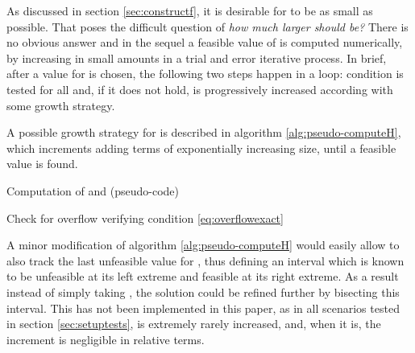 \documentclass[preprint,1p,times]{elsarticle}
\begin{document}
As discussed in section \ref{sec:constructf}, it is desirable for  to be as small as possible. That poses the difficult question of \textit{how much larger should  be?} There is no obvious answer and in the sequel a feasible value of  is computed numerically, by increasing  in small amounts in a trial and error iterative process. In brief, after a value for  is chosen, the following two steps happen in a loop: condition  is tested for all  and, if it does not hold,  is progressively increased according with some growth strategy. 

A possible growth strategy for  is described in algorithm \ref{alg:pseudo-computeH}, which increments  adding terms of exponentially increasing size, until a feasible value is found. 
\begin{algorithm}[h]
	\caption{Computation of  and  (pseudo-code)}
	\label{alg:pseudo-computeH}
	\begin{algorithmic}
			\State	 {}
			\State {}
			\If {} 
			\EndIf
	     	\State {} 
			\For {}
				\State {}
				\State {}
					\If {} 
				\EndIf
				\While {} 
					\State {} 
					\If {} \Comment Check for overflow verifying condition \eqref{eq:overflowexact}
					\EndIf 
					\State {} 
				\EndWhile
			\EndFor
			\State  {}
		\EndFunction
	\end{algorithmic}
\end{algorithm}

A minor modification of algorithm \ref{alg:pseudo-computeH} would easily allow to also track the last unfeasible value for , thus defining an interval  which is known to be unfeasible at its left extreme and feasible at its right extreme. As a result instead of simply taking , the solution could be refined further by bisecting this interval. This has not been implemented in this paper, as in all scenarios tested in section \ref{sec:setuptests},  is extremely rarely increased, and, when it is, the increment is negligible in relative terms.
\end{document}
